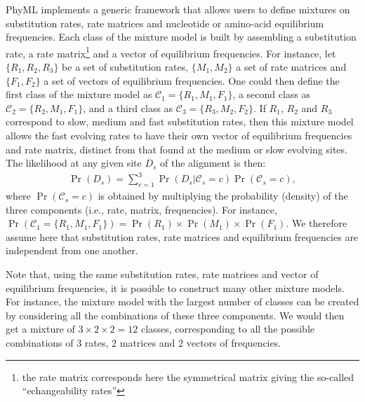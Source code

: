\documentclass[a4paper,12pt]{article}
\begin{document}
PhyML implements  a generic framework  that allows users to  define mixtures on  substitution rates,
rate matrices and nucleotide or amino-acid equilibrium  frequencies. Each class of the mixture model
is built by assembling a substitution rate,  a rate matrix\footnote{the rate matrix corresponds here
the symmetrical  matrix giving the so-called  ``echangeability rates''} and a  vector of equilibrium
frequencies.  For  instance, let $\{R_1,R_2,R_3\}$ be  a set of substitution  rates, $\{M_1,M_2\}$ a
set of rate matrices and $\{F_1,F_2\}$ a set  of vectors of equilibrium frequencies.  One could then
define the first class of the mixture model  as $\mathcal{C}_1 = \{R_1,M_1,F_1\}$, a second class as
$\mathcal{C}_2  = \{R_2,M_1,F_1\}$,  and a  third class  as $\mathcal{C}_3  = \{R_3,M_2,F_2\}$.   If
$R_1$, $R_2$  and $R_3$ correspond to  slow, medium and  fast substitution rates, then  this mixture
model allows the  fast evolving rates to have  their own vector of equilibrium  frequencies and rate
matrix, distinct from that found at the medium  or slow evolving sites.  The likelihood at any given
site $D_s$ of the alignment is then:
\begin{eqnarray}\label{equ:mixtlk}
\Pr(D_s) = \sum_{c=1}^{3} \Pr(D_s | \mathcal{C}_s=c) \Pr(\mathcal{C}_s=c),
\end{eqnarray}
where  $\Pr(\mathcal{C}_s=c)$ is  obtained by  multiplying the  probability (density)  of  the three
components (i.e., rate, matrix, frequencies). For instance, $\Pr(\mathcal{C}_1=\{R_1,M_1,F_1\}) =
 \Pr(R_1)\times \Pr(M_1) \times \Pr(F_1)$.
We therefore assume here that substitution rates, rate
matrices and equilibrium frequencies are independent from one another.

Note that, using the  same substitution rates, rate matrices and  vector of equilibrium frequencies,
it is  possible to construct  many other mixture  models. For instance,  the mixture model  with the
largest  number of  classes  can be  created  by considering  all the  combinations  of these  three
components.  We would  then get a mixture of  $3\times 2 \times 2=12$ classes,  corresponding to all
the possible combinations of 3 rates, 2 matrices and 2 vectors of frequencies.


 
\end{document}

